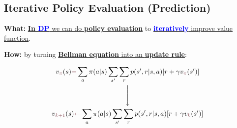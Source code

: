 \documentclass[12pt, a4paper]{article}
\begin{document}
\subsection{Iterative Policy Evaluation (Prediction)}\label{policy-evaluation-prediction}

\textbf{What:} \uline{\textbf{In \textcolor{blue}{DP}} we can do \textbf{policy evaluation}} to \uline{\textbf{\textcolor{blue}{iteratively}} improve value function}.


\textbf{How:} by turning \uline{\textbf{Bellman equation} into an \textbf{update rule}}:

  \begin{gather*}
    v_{\textcolor[HTML]{8F5760}{\pi}}(s) \textcolor[HTML]{8F5760}{=} \sum_a \pi(a|s) \sum_{s'} \sum_{r} p(s',r|s,a) [r + \gamma v_{\textcolor[HTML]{8F5760}{\pi}}(s')] \\
    \Bigg\downarrow \\
    v_{\textcolor[HTML]{8F5760}{k+1}}(s) \textcolor[HTML]{8F5760}{\leftarrow} \sum_a \pi(a|s) \sum_{s'} \sum_{r} p(s',r|s,a) [r + \gamma v_{\textcolor[HTML]{8F5760}{k}}(s')] \\
  \end{gather*}
\end{document}
